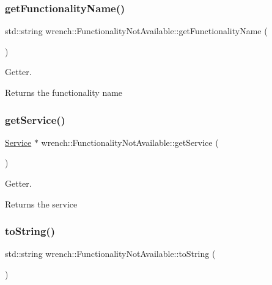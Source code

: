 \subsubsection{\texorpdfstring{get\+Functionality\+Name()}{getFunctionalityName()}}
{\footnotesize\ttfamily std\+::string wrench\+::\+Functionality\+Not\+Available\+::get\+Functionality\+Name (\begin{DoxyParamCaption}{ }\end{DoxyParamCaption})}



Getter. 

\begin{DoxyReturn}{Returns}
the functionality name 
\end{DoxyReturn}
\mbox{\label{classwrench_1_1_functionality_not_available_a0c29976839df8de89c833e135f754bbb}} 
\subsubsection{\texorpdfstring{get\+Service()}{getService()}}
{\footnotesize\ttfamily \hyperlink{classwrench_1_1_service}{Service} $\ast$ wrench\+::\+Functionality\+Not\+Available\+::get\+Service (\begin{DoxyParamCaption}{ }\end{DoxyParamCaption})}



Getter. 

\begin{DoxyReturn}{Returns}
the service 
\end{DoxyReturn}
\mbox{\label{classwrench_1_1_functionality_not_available_af19ea11f7e3d50d0bea7c8a66b7b1221}} 
\subsubsection{\texorpdfstring{to\+String()}{toString()}}
{\footnotesize\ttfamily std\+::string wrench\+::\+Functionality\+Not\+Available\+::to\+String (\begin{DoxyParamCaption}{ }\end{DoxyParamCaption})\hspace{0.3cm}{\ttfamily [virtual]}}



